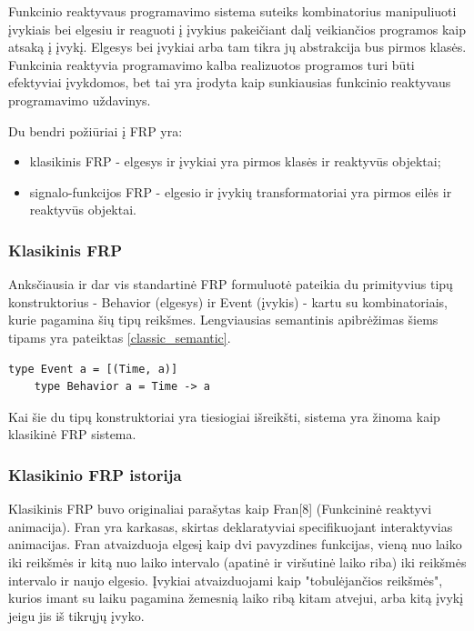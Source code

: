 Funkcinio reaktyvaus programavimo sistema suteiks kombinatorius manipuliuoti įvykiais bei elgesiu ir reaguoti į įvykius pakeičiant dalį veikiančios programos kaip atsaką į įvykį. Elgesys bei įvykiai arba tam tikra jų abstrakcija bus pirmos klasės. Funkcinia reaktyvia programavimo kalba realizuotos programos turi būti efektyviai įvykdomos, bet tai yra įrodyta kaip sunkiausias funkcinio reaktyvaus programavimo uždavinys.

Du bendri požiūriai į FRP yra:

\begin{itemize}

	\item klasikinis FRP - elgesys ir įvykiai yra pirmos klasės ir reaktyvūs objektai;

	\item signalo-funkcijos FRP - elgesio ir įvykių transformatoriai yra pirmos eilės ir reaktyvūs objektai.

\end{itemize}


\subsubsection{Klasikinis FRP}

Anksčiausia ir dar vis standartinė FRP formuluotė pateikia du primityvius tipų konstruktorius - Behavior (elgesys) ir Event (įvykis) - kartu su kombinatoriais, kurie pagamina šių tipų reikšmes. Lengviausias semantinis apibrėžimas šiems tipams yra pateiktas \ref{classic_semantic}.

\begin{lstlisting}[caption=- klasikinio FRP semantiniai tipai, label=classic_semantic]
	type Event a = [(Time, a)]
	type Behavior a = Time -> a
\end{lstlisting} 

Kai šie du tipų konstruktoriai yra tiesiogiai išreikšti, sistema yra žinoma kaip klasikinė FRP sistema.

\subsubsection{Klasikinio FRP istorija}

Klasikinis FRP buvo originaliai parašytas kaip Fran[8] (Funkcininė reaktyvi animacija). Fran yra karkasas, skirtas deklaratyviai specifikuojant interaktyvias animacijas. Fran atvaizduoja elgesį kaip dvi pavyzdines funkcijas, vieną nuo laiko iki reikšmės ir kitą nuo laiko intervalo (apatinė ir viršutinė laiko riba) iki reikšmės intervalo ir naujo elgesio. Įvykiai atvaizduojami kaip "tobulėjančios reikšmės", kurios imant su laiku pagamina žemesnią laiko ribą kitam atvejui, arba kitą įvykį jeigu jis iš tikrųjų įvyko.


